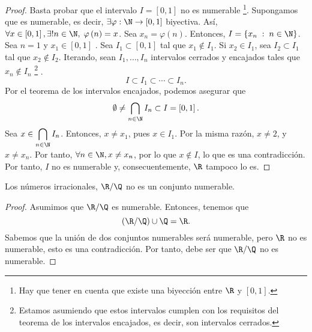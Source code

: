 \begin{proof}
	Basta probar que el intervalo $\displaystyle I =\left[0,1\right]  $ no es numerable \footnote{Hay que tener en cuenta que existe una biyección entre $\displaystyle \R $ y $\displaystyle \left[0,1\right]  $.}. Supongamos que es numerable, es decir, $\displaystyle \exists \varphi : \N \to \left[0,1\right]  $ biyectiva. Así, $\displaystyle \forall x \in \left[0,1\right], \exists! n \in \N, \; \varphi\left(n\right) =x $. Sea $\displaystyle x_{n}=\varphi\left(n\right) $. Entonces, $\displaystyle I = \left\{ x_{n} \; : \; n \in \N\right\}  $. Sea $\displaystyle n = 1 $ y $\displaystyle x_{1} \in [0,1] $ . Sea $\displaystyle I_{1} \subset \left[0,1\right]  $ tal que $\displaystyle x_{1} \not\in I_{1} $. Si $\displaystyle x_{2} \in I_{1} $, sea $\displaystyle I_{2}\subset I_{1} $ tal que $\displaystyle x_{2} \not\in I_{2} $. Iterando, sean $\displaystyle I_{1}, \ldots, I_{n} $ intervalos cerrados y encajados tales que $\displaystyle x_{n} \not\in I_{n} $ \footnote{Estamos asumiendo que estos intervalos cumplen con los requisitos del teorema de los intervalos encajados, es decir, son intervalos cerrados.} .
	\[I \subset I_{1} \subset \cdots \subset I_{n} .\]
Por el teorema de los intervalos encajados, podemos asegurar que 
\[\emptyset\neq\bigcap_{n\in \N} I_{n} \subset I = \left[0,1\right]  .\]
Sea $\displaystyle x \in \bigcap_{n\in \N}I_{n} $. Entonces, $\displaystyle x \neq x_{1}$, pues $x \in I_{1} $. Por la misma razón, $\displaystyle x \neq 2 $, y $\displaystyle x \neq x_{n} $. Por tanto, $\displaystyle \forall n \in \N, x \neq x_{n} $, por lo que $\displaystyle x \not\in I $, lo que es una contradicción. Por tanto, $\displaystyle I $ no es numerable y, consecuentemente, $\displaystyle \R $ tampoco lo es.
\end{proof}

\begin{fcolorary}[]
\normalfont Los números irracionales, $\displaystyle \R/\Q $ no es un conjunto numerable.
\end{fcolorary}

\begin{proof}
Asumimos que $\displaystyle \R/\Q $ es numerable. Entonces, tenemos que 
\[\left(\R/\Q\right)\cup\Q = \R .\]
Sabemos que la unión de dos conjuntos numerables será numerable, pero $\displaystyle \R $ no es numerable, esto es una contradicción. Por tanto, debe ser que $\displaystyle \R/\Q $ no es numerable.
\end{proof}


